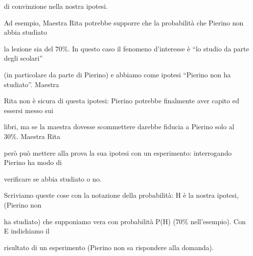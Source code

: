 \documentclass[a4paper,portrait,12pt]{article}
\begin{document}
\begin{flushleft}
di convinzione nella nostra ipotesi.
\end{flushleft}


\begin{flushleft}
Ad esempio, Maestra Rita potrebbe supporre che la probabilit\`{a} che Pierino non abbia studiato
\end{flushleft}


\begin{flushleft}
la lezione sia del 70\%. In questo caso il fenomeno d'interesse \`{e} {``}lo studio da parte degli scolari''
\end{flushleft}


\begin{flushleft}
(in particolare da parte di Pierino) e abbiamo come ipotesi {``}Pierino non ha studiato''. Maestra
\end{flushleft}


\begin{flushleft}
Rita non \`{e} sicura di questa ipotesi: Pierino potrebbe finalmente aver capito ed essersi messo sui
\end{flushleft}


\begin{flushleft}
libri, ma se la maestra dovesse scommettere darebbe fiducia a Pierino solo al 30\%. Maestra Rita
\end{flushleft}


\begin{flushleft}
per\`{o} pu\`{o} mettere alla prova la sua ipotesi con un esperimento: interrogando Pierino ha modo di
\end{flushleft}


\begin{flushleft}
verificare se abbia studiato o no.
\end{flushleft}


\begin{flushleft}
Scriviamo queste cose con la notazione della probabilit\`{a}: H \`{e} la nostra ipotesi, (Pierino non
\end{flushleft}


\begin{flushleft}
ha studiato) che supponiamo vera con probabilit\`{a} P(H) (70\% nell'esempio). Con E indichiamo il
\end{flushleft}


\begin{flushleft}
risultato di un esperimento (Pierino non sa rispondere alla domanda).
\end{flushleft}
\end{document}
